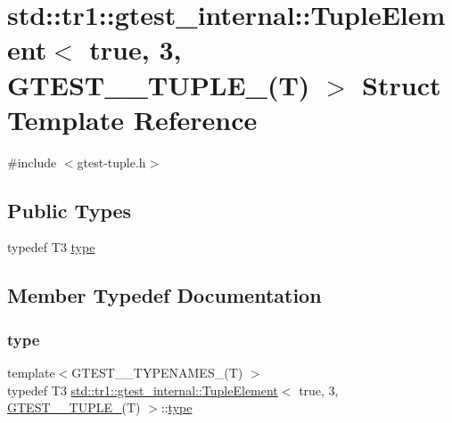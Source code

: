 \hypertarget{structstd_1_1tr1_1_1gtest__internal_1_1_tuple_element_3_01true_00_013_00_01_g_t_e_s_t__10___t_u_p_l_e___07_t_08_01_4}{}\section{std\+::tr1\+::gtest\+\_\+internal\+::Tuple\+Element$<$ true, 3, G\+T\+E\+S\+T\+\_\+\_\+\+T\+U\+P\+L\+E\+\_\+(T) $>$ Struct Template Reference}
\label{structstd_1_1tr1_1_1gtest__internal_1_1_tuple_element_3_01true_00_013_00_01_g_t_e_s_t__10___t_u_p_l_e___07_t_08_01_4}


{\ttfamily \#include $<$gtest-\/tuple.\+h$>$}

\subsection*{Public Types}
\begin{DoxyCompactItemize}
\item 
typedef T3 \mbox{\hyperlink{structstd_1_1tr1_1_1gtest__internal_1_1_tuple_element_3_01true_00_013_00_01_g_t_e_s_t__10___t_u_p_l_e___07_t_08_01_4_a0abc8519ff756a7736076063626a2718}{type}}
\end{DoxyCompactItemize}


\subsection{Member Typedef Documentation}
\mbox{\label{structstd_1_1tr1_1_1gtest__internal_1_1_tuple_element_3_01true_00_013_00_01_g_t_e_s_t__10___t_u_p_l_e___07_t_08_01_4_a0abc8519ff756a7736076063626a2718}} 
\subsubsection{\texorpdfstring{type}{type}}
{\footnotesize\ttfamily template$<$G\+T\+E\+S\+T\+\_\+\_\+\+T\+Y\+P\+E\+N\+A\+M\+E\+S\+\_\+(\+T) $>$ \\
typedef T3 \mbox{\hyperlink{structstd_1_1tr1_1_1gtest__internal_1_1_tuple_element}{std\+::tr1\+::gtest\+\_\+internal\+::\+Tuple\+Element}}$<$ true, 3, \mbox{\hyperlink{namespacestd_1_1tr1_aa636d3269bf1f368a7bc09ff158bc482}{G\+T\+E\+S\+T\+\_\+\_\+\+T\+U\+P\+L\+E\+\_\+}}(T) $>$\+::\mbox{\hyperlink{structstd_1_1tr1_1_1gtest__internal_1_1_tuple_element_3_01true_00_013_00_01_g_t_e_s_t__10___t_u_p_l_e___07_t_08_01_4_a0abc8519ff756a7736076063626a2718}{type}}}



